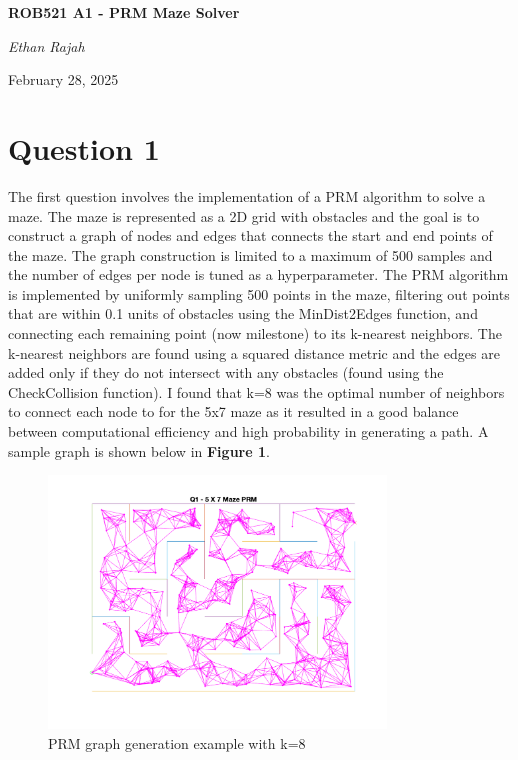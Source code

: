 \documentclass{article}
\begin{document}
\begin{titlepage}
\centering
	\vspace*{\fill}
	{\huge\bfseries ROB521 A1 - PRM Maze Solver\par}
	\vspace{7cm}
	{\Large\itshape Ethan Rajah\par}
	{\Large February 28, 2025\par}
	\vspace*{\fill}
\end{titlepage}

\newpage
\section{Question 1}
The first question involves the implementation of a PRM algorithm to solve a maze.
The maze is represented as a 2D grid with obstacles and the goal is to construct a graph
of nodes and edges that connects the start and end points of the maze. The graph construction is limited
to a maximum of 500 samples and the number of edges per node is tuned as a hyperparameter.
The PRM algorithm is implemented by uniformly sampling 500 points in the maze,
filtering out points that are within 0.1 units of obstacles using the MinDist2Edges function,
and connecting each remaining point (now milestone) to its k-nearest neighbors. The k-nearest neighbors are found using
a squared distance metric and the edges are added only if they do not intersect with any obstacles
(found using the CheckCollision function). I found that k=8 was the optimal number of neighbors
to connect each node to for the 5x7 maze as it resulted in a good balance between computational efficiency
and high probability in generating a path. A sample graph is shown below in \textbf{Figure 1}.

\begin{figure}[h]
    \centering
    \includegraphics[width=0.8\textwidth]{assignment1_q1.png}
    \caption{PRM graph generation example with k=8}
\end{figure}
\end{document}
